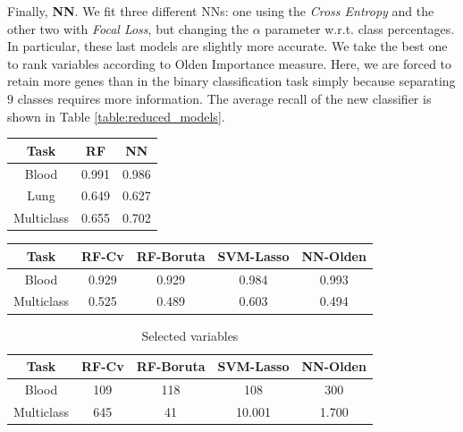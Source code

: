 \documentclass[a4paper,11pt, oneside]{article}  %
\begin{document}
Finally, \textbf{NN}. We fit three different NNs: one using the \textit{Cross Entropy} and the other two with \textit{Focal Loss}, but changing the $\alpha$ parameter w.r.t. class percentages. In particular, these last models are slightly more accurate. We take the best one to rank variables according to Olden Importance measure.  Here, we are forced to retain more genes than in the binary classification task simply because separating $9$ classes requires more information. The average recall of the new classifier is shown in Table \ref{table:reduced_models}.
\bigskip

\begin{minipage}[c]{0.4\textwidth}
	\centering
	\begin{tabular}{c c c}
		\hline\hline
		Task & RF & NN \\ [0.5ex] %
		\hline
		Blood & 0.991  & 0.986 \\
		Lung & 0.649  & 0.627 \\
		Multiclass & 0.655 & 0.702 \\ [1ex]
		\hline
	\end{tabular}
	\label{table:big_models}
\end{minipage}
\hspace{0.3cm}
\begin{minipage}[c]{0.5\textwidth}
	\centering
	\begin{tabular}{c c c c c}
		\hline\hline
		Task & RF-Cv & RF-Boruta & SVM-Lasso & NN-Olden \\ [0.5ex]
		\hline
		Blood & 0.929 & 0.929 & 0.984 & 0.993 \\
		Multiclass & 0.525 & 0.489 & 0.603 & 0.494 \\ [1ex]
		\hline
	\end{tabular}
	\label{table:reduced_models}
\end{minipage}
\bigskip

\begin{table}[h!]
	\centering
	\begin{tabular}{c c c c c}
		\hline\hline
		Task & RF-Cv &  RF-Boruta & SVM-Lasso & NN-Olden \\ [0.5ex] 
		\hline
		Blood & 109 & 118 & 108 & 300 \\
		Multiclass & 645 &  41 & 10.001 & 1.700 \\ [1ex]
		\hline
	\end{tabular}
	\caption{Selected variables}
	\label{table:selected variables}
\end{table}
\end{document}
